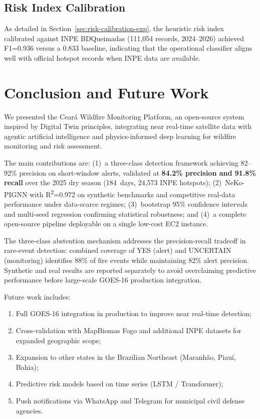 \documentclass[preprint,12pt,times,numbers]{elsarticle}
\begin{document}
\subsection{Risk Index Calibration}

As detailed in Section~\ref{sec:risk-calibration-exp}, the heuristic risk index calibrated against INPE BDQueimadas (111{,}054 records, 2024--2026) achieved F1=0.936 versus a 0.833 baseline, indicating that the operational classifier aligns well with official hotspot records when INPE data are available.

\section{Conclusion and Future Work}
\label{sec:conclusion}

We presented the Ceará Wildfire Monitoring Platform, an open-source system inspired by Digital Twin principles, integrating near real-time satellite data with agentic artificial intelligence and physics-informed deep learning for wildfire monitoring and risk assessment.

The main contributions are: (1)~a three-class detection framework achieving 82--92\% precision on short-window alerts, validated at \textbf{84.2\% precision and 91.8\% recall} over the 2025 dry season (184~days, 24{,}573 INPE hotspots); (2)~NeKo-PIGNN with R\textsuperscript{2}=0.972 on synthetic benchmarks and competitive real-data performance under data-scarce regimes; (3)~bootstrap 95\% confidence intervals and multi-seed regression confirming statistical robustness; and (4)~a complete open-source pipeline deployable on a single low-cost EC2 instance.

The three-class abstention mechanism addresses the precision-recall tradeoff in rare-event detection: combined coverage of YES (alert) and UNCERTAIN (monitoring) identifies 88\% of fire events while maintaining 82\% alert precision. Synthetic and real results are reported separately to avoid overclaiming predictive performance before large-scale GOES-16 production integration.

Future work includes:

\begin{enumerate}
    \item Full GOES-16 integration in production to improve near real-time detection;
    \item Cross-validation with MapBiomas Fogo and additional INPE datasets for expanded geographic scope;
    \item Expansion to other states in the Brazilian Northeast (Maranhão, Piauí, Bahia);
    \item Predictive risk models based on time series (LSTM / Transformer);
    \item Push notifications via WhatsApp and Telegram for municipal civil defense agencies.
\end{enumerate}
\end{document}
